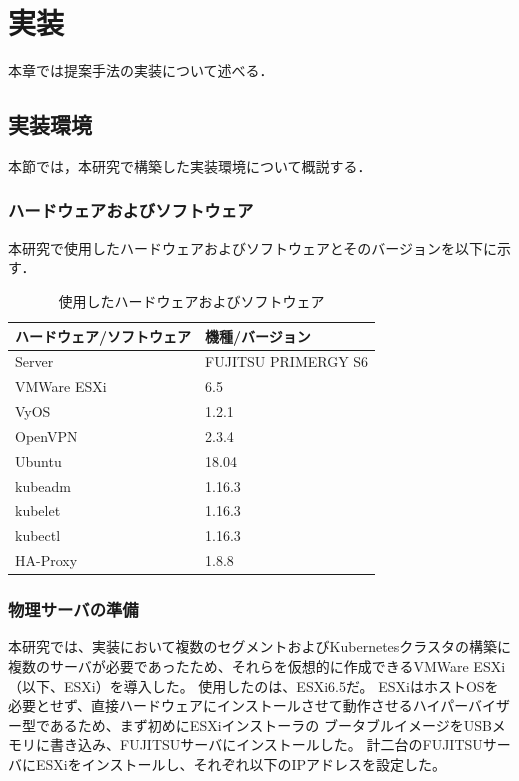\chapter{実装}
\label{implementation}

本章では提案手法の実装について述べる．

\section{実装環境}
\label{implementation:environment}

本節では，本研究で構築した実装環境について概説する．

\subsection{ハードウェアおよびソフトウェア}
\label{implementation:environment:resouces}

本研究で使用したハードウェアおよびソフトウェアとそのバージョンを以下に示す．

\begin{table}[htb]
  \begin{center}
    \caption{使用したハードウェアおよびソフトウェア}
    \begin{tabular}{|l|l|} \hline
      ハードウェア/ソフトウェア & 機種/バージョン \\ \hline
      Server & FUJITSU PRIMERGY S6 \\ \hline
      VMWare ESXi & 6.5 \\ \hline
      VyOS & 1.2.1 \\ \hline
      OpenVPN & 2.3.4 \\ \hline
      Ubuntu & 18.04 \\ \hline
      kubeadm & 1.16.3 \\ \hline
      kubelet & 1.16.3 \\ \hline
      kubectl & 1.16.3 \\ \hline
      HA-Proxy & 1.8.8 \\ \hline
    \end{tabular}
  \end{center}
\end{table}

\subsection{物理サーバの準備}
\label{implementation:esxi}

本研究では、実装において複数のセグメントおよびKubernetesクラスタの構築に複数のサーバが必要であったため、それらを仮想的に作成できるVMWare ESXi（以下、ESXi）を導入した。
使用したのは、ESXi6.5だ。
ESXiはホストOSを必要とせず、直接ハードウェアにインストールさせて動作させるハイパーバイザー型であるため、まず初めにESXiインストーラの
ブータブルイメージをUSBメモリに書き込み、FUJITSUサーバにインストールした。
計二台のFUJITSUサーバにESXiをインストールし、それぞれ以下のIPアドレスを設定した。

